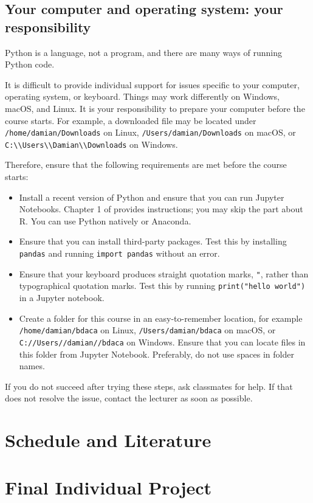 \documentclass[a4paper,10pt,twocolumn]{report}
\newenvironment{corona}{%
    \begin{shaded*}%
    }{%
    \end{shaded*}%
}
\begin{document}
\begin{corona}
\section{Your computer and operating system: your responsibility}
\label{sec:yourcomputer}

Python is a language, not a program, and there are many ways of running Python code.

It is difficult to provide individual support for issues specific to your computer, operating system, or keyboard. Things may work differently on Windows, macOS, and Linux. It is your responsibility to prepare your computer before the course starts. For example, a downloaded file may be located under \texttt{/home/damian/Downloads} on Linux, \texttt{/Users/damian/Downloads} on macOS, or \texttt{C:\textbackslash\textbackslash Users\textbackslash\textbackslash Damian\textbackslash\textbackslash Downloads} on Windows.

Therefore, ensure that the following requirements are met before the course starts:

\begin{itemize}
    \item Install a recent version of Python and ensure that you can run Jupyter Notebooks. Chapter 1 of \cite{cssbook} provides instructions; you may skip the part about R. You can use Python natively or Anaconda.
    \item Ensure that you can install third-party packages. Test this by installing \texttt{pandas} and running \texttt{import pandas} without an error.
    \item Ensure that your keyboard produces straight quotation marks, \texttt{"}, rather than typographical quotation marks. Test this by running \texttt{print("hello world")} in a Jupyter notebook.
    \item Create a folder for this course in an easy-to-remember location, for example \texttt{/home/damian/bdaca} on Linux, \texttt{/Users/damian/bdaca} on macOS, or \texttt{C://Users//damian//bdaca} on Windows. Ensure that you can locate files in this folder from Jupyter Notebook. Preferably, do not use spaces in folder names.
\end{itemize}

If you do not succeed after trying these steps, ask classmates for help. If that does not resolve the issue, contact the lecturer as soon as possible.
\end{corona}

\chapter{Schedule and Literature}




\appendix
\chapter{Final Individual Project}
\newcommand{\finalprojectheading}{}




\end{document}
